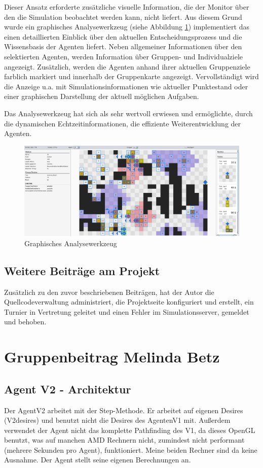 \documentclass[runningheads]{llncs}
\begin{document}
Dieser Ansatz erforderte zusätzliche visuelle Information, die der Monitor über den die Simulation beobachtet werden kann, nicht liefert. Aus diesem Grund wurde ein graphisches Analysewerkzeug (siehe Abbildung \ref{debugger}) implementiert das einen detaillierten Einblick über den aktuellen Entscheidungsprozess und die Wissensbasis der Agenten liefert. Neben allgemeiner Informationen über den selektierten Agenten, werden Information über Gruppen- und Individualziele angezeigt. Zusätzlich, werden die Agenten anhand ihrer aktuellen Gruppenziele farblich markiert und innerhalb der Gruppenkarte angezeigt.
Vervollständigt wird die Anzeige u.a. mit Simulationsinformationen wie aktueller Punktestand oder einer graphischen Darstellung der aktuell möglichen Aufgaben.

Das Analysewerkzeug hat sich als sehr wertvoll erwiesen und ermöglichte, durch die dynamischen Echtzeitinformationen, die effiziente Weiterentwicklung der Agenten.

\begin{figure}[h]
\includegraphics[scale=0.091]{./Referenzen/Debugger2.png}
\caption{Graphisches Analysewerkzeug}
\label{debugger}
\end{figure}

\subsection{Weitere Beiträge am Projekt}
Zusätzlich zu den zuvor beschriebenen Beiträgen, hat der Autor die Quellcodeverwaltung \cite{Github} administriert, die Projektseite \cite{Site} konfiguriert und erstellt, ein Turnier in Vertretung geleitet und einen Fehler im Simulationsserver, gemeldet \cite{Bug} und behoben.


\section{Gruppenbeitrag Melinda Betz}
\subsection{Agent V2 - Architektur}
Der AgentV2 arbeitet mit der Step-Methode. 
Er arbeitet auf eigenen Desires (V2desires) und benutzt nicht die Desires des AgentenV1 mit. Außerdem verwendet der Agent nicht das komplette Pathfinding des V1, da dieses OpenGL benutzt, was auf manchen AMD Rechnern nicht, zumindest nicht performant (mehrere Sekunden pro Agent), funktioniert. Meine beiden Rechner sind da keine Ausnahme. Der Agent stellt seine eigenen Berechnungen an. 
 
\end{document}
